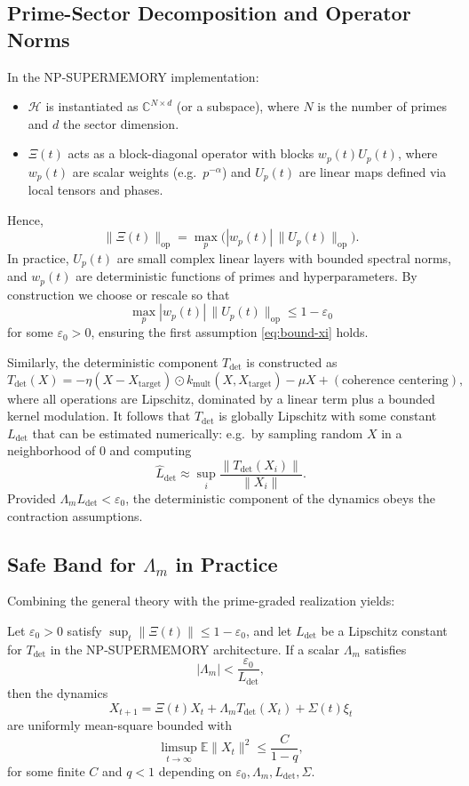 \documentclass[11pt]{article}
\begin{document}
\subsection{Prime-Sector Decomposition and Operator Norms}

In the NP-SUPERMEMORY implementation:
\begin{itemize}
\item $\mathcal{H}$ is instantiated as $\mathbb{C}^{N\times d}$ (or a subspace), where $N$ is the number of primes and $d$ the sector dimension.
\item $\Xi(t)$ acts as a block-diagonal operator with blocks $w_p(t) U_p(t)$, where $w_p(t)$ are scalar weights (e.g.\ $p^{-\alpha}$) and $U_p(t)$ are linear maps defined via local tensors and phases.
\end{itemize}

Hence,
\[
\|\Xi(t)\|_{\mathrm{op}} = \max_{p} \big(|w_p(t)|\,\|U_p(t)\|_{\mathrm{op}}\big).
\]
In practice, $U_p(t)$ are small complex linear layers with bounded spectral norms, and $w_p(t)$ are deterministic functions of primes and hyperparameters. By construction we choose or rescale so that
\[
\max_{p}|w_p(t)|\,\|U_p(t)\|_{\mathrm{op}} \le 1 - \varepsilon_0
\]
for some $\varepsilon_0>0$, ensuring the first assumption \eqref{eq:bound-xi} holds.

Similarly, the deterministic component $T_{\det}$ is constructed as
\[
T_{\det}(X) = -\eta (X - X_{\mathrm{target}})\odot k_{\mathrm{mult}}(X,X_{\mathrm{target}}) - \mu X + (\text{coherence centering}),
\]
where all operations are Lipschitz, dominated by a linear term plus a bounded kernel modulation. It follows that $T_{\det}$ is globally Lipschitz with some constant $L_{\det}$ that can be estimated numerically: e.g.\ by sampling random $X$ in a neighborhood of 0 and computing
\[
\hat{L}_{\det} \approx \sup_{i} \frac{\|T_{\det}(X_i)\|}{\|X_i\|}.
\]
Provided $\Lambda_m L_{\det}<\varepsilon_0$, the deterministic component of the dynamics obeys the contraction assumptions.

\subsection{Safe Band for $\Lambda_m$ in Practice}

Combining the general theory with the prime-graded realization yields:

\begin{theorem}
Let $\varepsilon_0>0$ satisfy $\sup_t\|\Xi(t)\|\le 1-\varepsilon_0$, and let $L_{\det}$ be a Lipschitz constant for $T_{\det}$ in the NP-SUPERMEMORY architecture. If a scalar $\Lambda_m$ satisfies
\[
|\Lambda_m| < \frac{\varepsilon_0}{L_{\det}},
\]
then the dynamics
\[
X_{t+1} = \Xi(t) X_t + \Lambda_m T_{\det}(X_t) + \Sigma(t)\xi_t
\]
are uniformly mean-square bounded with
\[
\limsup_{t\to\infty}\mathbb{E}\|X_t\|^2 \le \frac{C}{1-q},
\]
for some finite $C$ and $q<1$ depending on $\varepsilon_0,\Lambda_m,L_{\det},\Sigma$.
\end{theorem}
\end{document}

